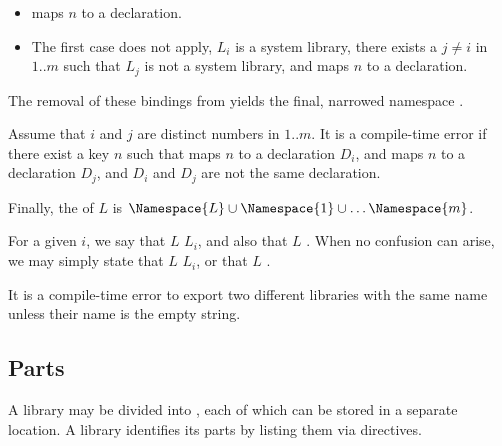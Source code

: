 \documentclass[makeidx]{article}
\begin{document}
{{\begin{itemize}
\item {} maps $n$ to a declaration.
\item The first case does not apply,
  $L_i$ is a system library,
  there exists a $j \not= i$ in $1 .. m$ such that
  $L_j$ is not a system library,
  and  maps $n$ to a declaration.
\end{itemize}

\LMHash{}%
The removal of these bindings from  yields the
final, narrowed namespace .

\LMHash{}%
Assume that $i$ and $j$ are distinct numbers in $1 .. m$.
It is a compile-time error if there exist a key $n$ such that
 maps $n$ to a declaration $D_i$,
and  maps $n$ to a declaration $D_j$,
and $D_i$ and $D_j$ are not the same declaration.
}


\LMHash{}%
Finally, the  of $L$ is
$\Namespace{L} \cup \Namespace{1} \cup \ldots \Namespace{m}$.


\LMHash{}%
For a given $i$,
we say that $L$  $L_i$,
and also that $L$  .
When no confusion can arise, we may simply state
that $L$  $L_i$, or
that $L$  .

\LMHash{}%
It is a compile-time error to export two different libraries with the same name
unless their name is the empty string.


\subsection{Parts}

\LMHash{}%
A library may be divided into , each of which can be stored in a separate location.
A library identifies its parts by listing them via \PART{} directives.

}
\end{document}
